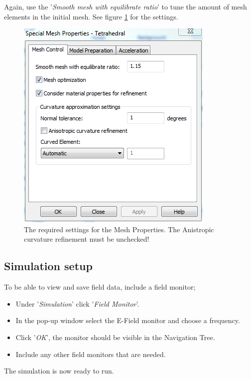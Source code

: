 Again, use the '\textit{Smooth mesh with equilibrate ratio}' to tune the amount of mesh elements in the initial mesh.
See figure \ref{fig:MeshProperties} for the settings.
\begin{figure}[h]
	\begin{center}
		\includegraphics[scale = .6]{Figures/MeshProperties}
		\caption{The required settings for the Mesh Properties. The Anistropic curvature refinement must be unchecked!}
		\label{fig:MeshProperties}
	\end{center}
\end{figure}

\subsection{Simulation setup}
To be able to view and save field data, include a field monitor;
\begin{itemize}
	\item Under '\textit{Simulation}' click '\textit{Field Monitor}'.
	\item In the pop-up window select the E-Field monitor and choose a frequency.
	\item Click '\textit{OK}', the monitor should be visible in the Navigation Tree.
	\item Include any other field monitors that are needed.
\end{itemize}
The simulation is now ready to run.

